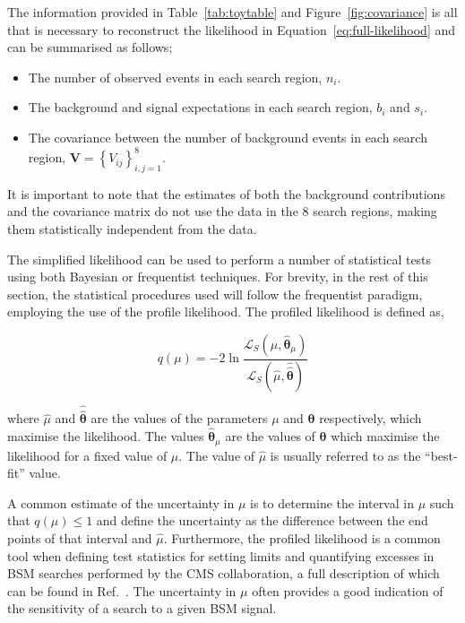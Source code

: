 The information provided in Table~\ref{tab:toytable} and Figure~\ref{fig:covariance} is all that is necessary to reconstruct the likelihood in Equation~\ref{eq:full-likelihood} and 
can be summarised as follows; 

\begin{itemize}
\item {The number of observed events in each search region, $n_{i}$.}
\item {The background and signal expectations in each search region, $b_{i}$ and $s_{i}$.}
\item {The covariance between the number of background events in each search region, $\mathrm{\mathbf{V}}=\left\{V_{ij}\right\}_{i,j=1}^{8}$. }
\end{itemize}

It is important to note that the estimates of both the background contributions and the 
covariance matrix do not use the data in the 8 search regions, making them statistically independent from the data. 

The simplified likelihood can be used to perform a number of statistical tests using both Bayesian or frequentist techniques. For brevity, in the rest of this section, 
the statistical procedures used will follow the frequentist paradigm, employing the use of the profile likelihood. The profiled likelihood is defined as, 

\begin{equation}
q(\mu) = -2\ln \dfrac {\mathcal{L}_{S}(\mu,\hat{\boldsymbol{\theta}}_{\mu})} {\mathcal{L}_{S}(\hat{\mu},\hat{\hat{\boldsymbol{\theta}}})}
\label{eq:llr}
\end{equation}

where $\hat{\mu}$ and $\hat{\hat{\boldsymbol{\theta}}}$ are the values of the parameters $\mu$ and $\boldsymbol{\theta}$ respectively, 
which maximise the likelihood. The values $\hat{\boldsymbol{\theta}}_{\mu}$ are the values of $\boldsymbol{\theta}$ which maximise the 
likelihood for a fixed value of $\mu$. The value of $\hat{\mu}$ is usually referred to as the ``best-fit'' value.

A common estimate of the uncertainty in $\mu$ is to determine the interval in $\mu$ such that $q(\mu)\leq1$ and define the uncertainty as the difference between 
the end points of that interval and $\hat{\mu}$. Furthermore, the profiled likelihood is a common tool when defining test statistics for setting limits and quantifying excesses 
in BSM searches performed by the CMS collaboration, a full description of which can be found in Ref.~\cite{Chatrchyan:2012tx}. The 
uncertainty in $\mu$ often provides a good indication of the sensitivity of a search to a given BSM signal. 

